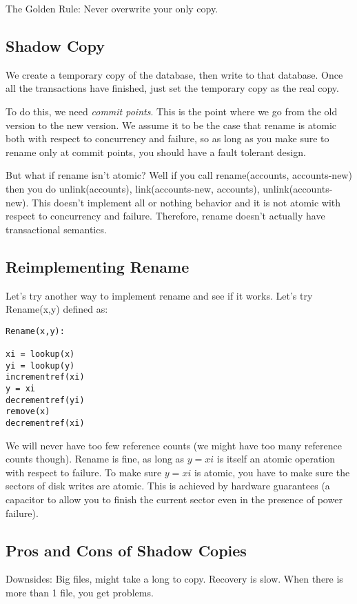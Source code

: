 \documentclass[psamsfonts]{amsart}
\begin{document}
The Golden Rule: Never overwrite your only copy.

\subsection{Shadow Copy}

We create a temporary copy of the database, then write to that database. Once all the transactions have finished, just set the temporary copy as the real copy.

To do this, we need \emph{commit points}. This is the point where we go from the old version to the new version. We assume it to be the case that rename is atomic both with respect to concurrency and failure, so as long as you make sure to rename only at commit points, you should have a fault tolerant design.

But what if rename isn't atomic? Well if you call rename(accounts, accounts-new) then you do unlink(accounts), link(accounts-new, accounts), unlink(accounts-new). This doesn't implement all or nothing behavior and it is not atomic with respect to concurrency and failure. Therefore, rename doesn't actually have transactional semantics.

\subsection{Reimplementing Rename}

Let's try another way to implement rename and see if it works. Let's try Rename(x,y) defined as:
\begin{verbatim}
Rename(x,y):

xi = lookup(x)
yi = lookup(y)
incrementref(xi)
y = xi
decrementref(yi)
remove(x)
decrementref(xi)
\end{verbatim}

We will never have too few reference counts (we might have too many reference counts though). Rename is fine, as long as $y = xi$ is itself an atomic operation with respect to failure. To make sure $y = xi$ is atomic, you have to make sure the sectors of disk writes are atomic. This is achieved by hardware guarantees (a capacitor to allow you to finish the current sector even in the presence of power failure).

\subsection{Pros and Cons of Shadow Copies}

Downsides: Big files, might take a long to copy. Recovery is slow. When there is more than 1 file, you get problems.
\end{document}
